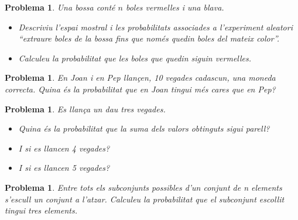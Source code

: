 \documentclass[11pt]{article}
\newcounter{prbcont}
\newtheorem{problema}[prbcont]{Problema}
\begin{document}
\begin{problema}
Una bossa cont\'e $n$ boles vermelles i una blava. 
\begin{itemize}
\item Descriviu l'espai mostral i les probabilitats associades a l'experiment aleatori ``extraure boles de la bossa fins que nom\'es quedin boles del mateix color''. 
\item Calculeu la probabilitat que les boles que quedin siguin vermelles.
\end{itemize}
\end{problema}

\begin{problema} 
En Joan i en Pep llan\c{c}en, 10 vegades cadascun, una moneda correcta. Quina \'es la probabilitat que en Joan tingui m\'es cares que en Pep?
\end{problema}

\begin{problema}
Es llan\c{c}a un dau tres vegades. 
\begin{itemize}
\item [(a)] Quina \'es la probabilitat que la suma dels valors obtinguts sigui parell? 
\item [(b)] I si es llancen 4 vegades? 
\item [(c)] I si es llancen 5 vegades?
\end{itemize}
\end{problema}

\begin{problema}
Entre tots els subconjunts possibles d'un conjunt de n elements s'escull un conjunt a l'atzar. Calculeu la probabilitat que el subconjunt escollit tingui tres elements.
\end{problema}
\end{document}

